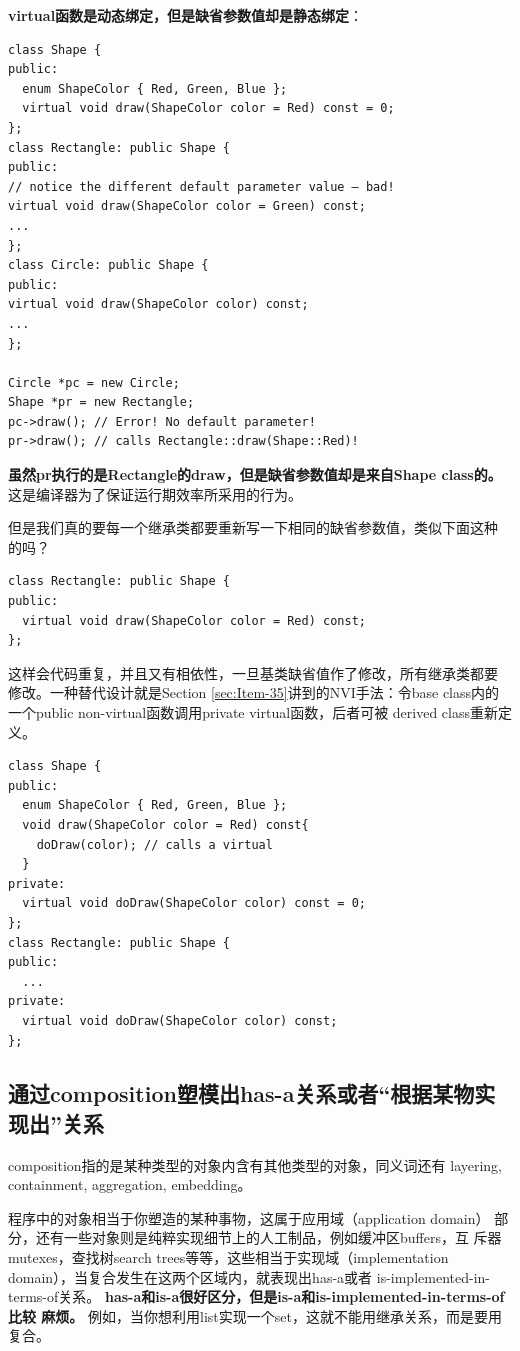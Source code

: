 \documentclass[a4paper,twoside]{article}
\theoremstyle{definition}
\theoremstyle{remark}
\numberwithin{equation}{section}
\begin{document}
\textbf{virtual函数是动态绑定，但是缺省参数值却是静态绑定}：
\begin{verbatim}
class Shape {
public:
  enum ShapeColor { Red, Green, Blue };
  virtual void draw(ShapeColor color = Red) const = 0;
};
class Rectangle: public Shape {
public:
// notice the different default parameter value — bad!
virtual void draw(ShapeColor color = Green) const;
...
};
class Circle: public Shape {
public:
virtual void draw(ShapeColor color) const;
...
};

Circle *pc = new Circle; 
Shape *pr = new Rectangle;
pc->draw(); // Error! No default parameter!
pr->draw(); // calls Rectangle::draw(Shape::Red)!
\end{verbatim}
\textbf{虽然pr执行的是Rectangle的draw，但是缺省参数值却是来自Shape
  class的。}这是编译器为了保证运行期效率所采用的行为。

但是我们真的要每一个继承类都要重新写一下相同的缺省参数值，类似下面这种
的吗？
\begin{verbatim}
class Rectangle: public Shape {
public:
  virtual void draw(ShapeColor color = Red) const;
};
\end{verbatim}
这样会代码重复，并且又有相依性，一旦基类缺省值作了修改，所有继承类都要
修改。一种替代设计就是Section \ref{sec:Item-35}讲到的NVI手法：令base
class内的一个public non-virtual函数调用private virtual函数，后者可被
derived class重新定义。
\begin{verbatim}
class Shape {
public:
  enum ShapeColor { Red, Green, Blue };
  void draw(ShapeColor color = Red) const{
    doDraw(color); // calls a virtual
  }
private:
  virtual void doDraw(ShapeColor color) const = 0; 
};
class Rectangle: public Shape {
public:
  ...
private:
  virtual void doDraw(ShapeColor color) const;
};
\end{verbatim}

\subsection{通过composition塑模出has-a关系或者“根据某物实现出”关系}
\label{sec:Item-38}

composition指的是某种类型的对象内含有其他类型的对象，同义词还有
layering, containment, aggregation, embedding。

程序中的对象相当于你塑造的某种事物，这属于应用域（application domain）
部分，还有一些对象则是纯粹实现细节上的人工制品，例如缓冲区buffers，互
斥器mutexes，查找树search trees等等，这些相当于实现域（implementation
domain），当复合发生在这两个区域内，就表现出has-a或者
is-implemented-in-terms-of关系。
\textbf{has-a和is-a很好区分，但是is-a和is-implemented-in-terms-of比较
  麻烦。}
例如，当你想利用list实现一个set，这就不能用继承关系，而是要用复合。
\end{document}
